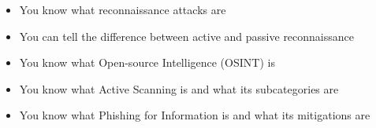\begin{itemize}
	\item You know what reconnaissance attacks are
	\item You can tell the difference between active and passive reconnaissance
	\item You know what Open-source Intelligence (OSINT) is
	\item You know what Active Scanning is and what its subcategories are
	\item You know what Phishing for Information is and what its mitigations are
\end{itemize}
